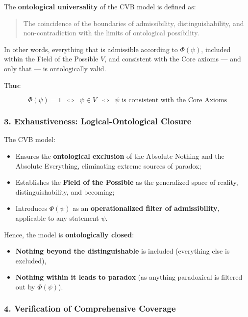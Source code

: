 \documentclass[12pt]{article}
\begin{document}
The \textbf{ontological universality} of the CVB model is defined as:

\begin{quote}
The coincidence of the boundaries of admissibility, distinguishability, and non-contradiction with the limits of ontological possibility.
\end{quote}

In other words, everything that is admissible according to $\Phi(\psi)$, included within the Field of the Possible $V$, and consistent with the Core axioms — and only that — is ontologically valid.

Thus:

\[
\Phi(\psi) = 1 \;\;\Longleftrightarrow\;\; \psi \in V \;\;\Longleftrightarrow\;\; \psi \text{ is consistent with the Core Axioms}
\]

\subsubsection*{3. Exhaustiveness: Logical-Ontological Closure}

The CVB model:

\begin{itemize}
\item Ensures the \textbf{ontological exclusion} of the Absolute Nothing and the Absolute Everything, eliminating extreme sources of paradox;
\item Establishes the \textbf{Field of the Possible} as the generalized space of reality, distinguishability, and becoming;
\item Introduces $\Phi(\psi)$ as an \textbf{operationalized filter of admissibility}, applicable to any statement $\psi$.
\end{itemize}

Hence, the model is \textbf{ontologically closed}:

\begin{itemize}
\item \textbf{Nothing beyond the distinguishable} is included (everything else is excluded),
\item \textbf{Nothing within it leads to paradox} (as anything paradoxical is filtered out by $\Phi(\psi)$).
\end{itemize}

\subsubsection*{4. Verification of Comprehensive Coverage}
\end{document}
